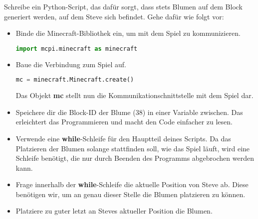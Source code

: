 \large Schreibe ein Python-Script, das dafür sorgt, dass stets Blumen auf dem Block generiert werden, auf dem Steve sich befindet.
Gehe dafür wie folgt vor:
\begin{itemize}
	\item Binde die Minecraft-Bibliothek ein, um mit dem Spiel zu kommunizieren.
	\begin{lstlisting}[language=Python]
import mcpi.minecraft as minecraft
	\end{lstlisting}
	
	\item Baue die Verbindung zum Spiel auf.
	\begin{lstlisting}[language=Python]
mc = minecraft.Minecraft.create()
	\end{lstlisting}
	Das Objekt \textbf{mc} stellt nun die Kommunikationschnittstelle mit dem Spiel dar.
	
	\item Speichere dir die Block-ID der Blume (38) in einer Variable zwischen. Das erleichtert das Programmieren und macht den Code einfacher zu lesen.
	
	\item Verwende eine \textbf{while}-Schleife für den Hauptteil deines Scripts. Da das Platzieren der Blumen solange stattfinden soll, wie das Spiel läuft, wird eine Schleife benötigt, die nur durch Beenden des Programms abgebrochen werden kann.
	
	\item Frage innerhalb der \textbf{while}-Schleife die aktuelle Position von Steve ab. Diese benötigen wir, um an genau dieser Stelle die Blumen platzieren zu können.
	
	\item Platziere zu guter letzt an Steves aktueller Position die Blumen. 
\end{itemize}